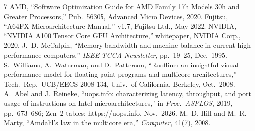 \documentclass[conference,10pt]{IEEEtran}
\begin{document}
{\let\footnotesize\scriptsize\begin{thebibliography}{7}
 AMD, ``Software Optimization Guide for AMD Family 17h Models 30h and Greater Processors,'' Pub.\ 56305, Advanced Micro Devices, 2020.
 Fujitsu, ``A64FX Microarchitecture Manual,'' v1.7, Fujitsu Ltd., May 2022.
 NVIDIA, ``NVIDIA A100 Tensor Core GPU Architecture,'' whitepaper, NVIDIA Corp., 2020.
 J.~D. McCalpin, ``Memory bandwidth and machine balance in current high performance computers,'' \emph{IEEE TCCA Newsletter}, pp.~19--25, Dec.\ 1995.
 S.~Williams, A.~Waterman, and D.~Patterson, ``Roofline: an insightful visual performance model for floating-point programs and multicore architectures,'' Tech.\ Rep.\ UCB/EECS-2008-134, Univ.\ of California, Berkeley, Oct.\ 2008.
 A.~Abel and J.~Reineke, ``uops.info: characterizing latency, throughput, and port usage of instructions on Intel microarchitectures,'' in \emph{Proc.\ ASPLOS}, 2019, pp.~673--686; Zen~2 tables: https://uops.info, Nov.\ 2026.
 M.~D. Hill and M.~R. Marty, ``Amdahl's law in the multicore era,'' \emph{Computer}, 41(7), 2008.
\end{thebibliography}}
\end{document}
